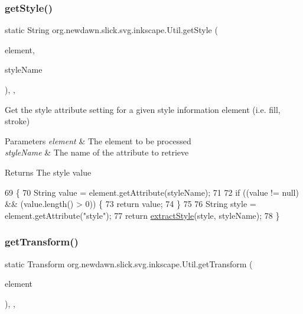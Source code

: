 \subsubsection{\texorpdfstring{get\+Style()}{getStyle()}}
{\footnotesize\ttfamily static String org.\+newdawn.\+slick.\+svg.\+inkscape.\+Util.\+get\+Style (\begin{DoxyParamCaption}\item[{Element}]{element,  }\item[{String}]{style\+Name }\end{DoxyParamCaption})\hspace{0.3cm}{\ttfamily [inline]}, {\ttfamily [static]}, {\ttfamily [package]}}

Get the style attribute setting for a given style information element (i.\+e. fill, stroke)


\begin{DoxyParams}{Parameters}
{\em element} & The element to be processed \\
\hline
{\em style\+Name} & The name of the attribute to retrieve \\
\hline
\end{DoxyParams}
\begin{DoxyReturn}{Returns}
The style value 
\end{DoxyReturn}

\begin{DoxyCode}
69                                                               \{
70         String value = element.getAttribute(styleName);
71         
72         \textcolor{keywordflow}{if} ((value != null) && (value.length() > 0)) \{
73             \textcolor{keywordflow}{return} value;
74         \}
75         
76         String style = element.getAttribute(\textcolor{stringliteral}{"style"});
77         \textcolor{keywordflow}{return} \mbox{\hyperlink{classorg_1_1newdawn_1_1slick_1_1svg_1_1inkscape_1_1_util_a97d0515ddad8d405e9770c1f1d1592e0}{extractStyle}}(style, styleName);
78     \}
\end{DoxyCode}
\mbox{\label{classorg_1_1newdawn_1_1slick_1_1svg_1_1inkscape_1_1_util_a96fccbd8e9ba06987f1e5d978f2b9ff4}} 
\subsubsection{\texorpdfstring{get\+Transform()}{getTransform()}\hspace{0.1cm}{\footnotesize\ttfamily [1/2]}}
{\footnotesize\ttfamily static Transform org.\+newdawn.\+slick.\+svg.\+inkscape.\+Util.\+get\+Transform (\begin{DoxyParamCaption}\item[{Element}]{element }\end{DoxyParamCaption})\hspace{0.3cm}{\ttfamily [inline]}, {\ttfamily [static]}, {\ttfamily [package]}}

